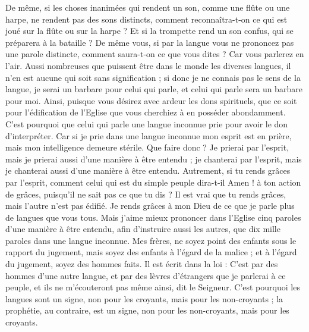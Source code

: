 \begin{multicols}{2}
De même, si les choses inanimées qui rendent un son, comme une flûte ou une harpe, ne rendent pas des sons distincts, comment reconnaîtra-t-on ce qui est joué sur la flûte ou sur la harpe ?
Et si la trompette rend un son confus, qui se préparera à la bataille ?
De même vous, si par la langue vous ne prononcez pas une parole distincte, comment saura-t-on ce que vous dites ? Car vous parlerez en l'air.
Aussi nombreuses que puissent être dans le monde les diverses langues, il n’en est aucune qui soit sans signification ;
si donc je ne connais pas le sens de la langue, je serai un barbare pour celui qui parle, et celui qui parle sera un barbare pour moi.
Ainsi, puisque vous désirez avec ardeur les dons spirituels, que ce soit pour l’édification de l'Eglise que vous cherchiez à en posséder abondamment.
C'est pourquoi que celui qui parle une langue inconnue prie pour avoir le don d’interpréter.
Car si je prie dans une langue inconnue mon esprit est en prière, mais mon intelligence demeure stérile.
Que faire donc ? Je prierai par l’esprit, mais je prierai aussi d'une manière à être entendu ; je chanterai par l’esprit, mais je chanterai aussi d'une manière à être entendu.
Autrement, si tu rends grâces par l’esprit, comment celui qui est du simple peuple dira-t-il Amen ! à ton action de grâces, puisqu'il ne sait pas ce que tu dis ?
Il est vrai que tu rends grâces, mais l’autre n’est pas édifié.
Je rends grâces à mon Dieu de ce que je parle plus de langues que vous tous.
Mais j'aime mieux prononcer dans l'Eglise cinq paroles d'une manière à être entendu, afin d’instruire aussi les autres, que dix mille paroles dans une langue inconnue.
Mes frères, ne soyez point des enfants sous le rapport du jugement, mais soyez des enfants à l’égard de la malice ; et à l'égard du jugement, soyez des hommes faits.
Il est écrit dans la loi : C’est par des hommes d’une autre langue, et par des lèvres d’étrangers que je parlerai à ce peuple, et ils ne m’écouteront pas même ainsi, dit le Seigneur.
C’est pourquoi les langues sont un signe, non pour les croyants, mais pour les non-croyants ; la prophétie, au contraire, est un signe, non pour les non-croyants, mais pour les croyants.

\end{multicols}
